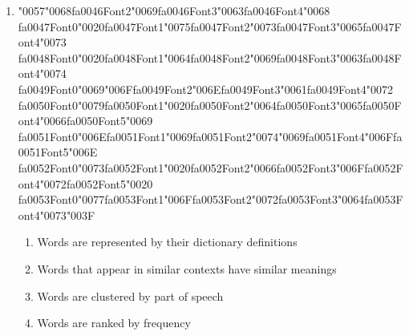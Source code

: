 \documentclass[12pt]{article}
\begin{document}
\begin{enumerate}[label=Q\arabic*.]
\item {\char"0057}{\char"0068}{\csname fa0046Font2\endcsname\char"0069}{\csname fa0046Font3\endcsname\char"0063}{\csname fa0046Font4\endcsname\char"0068} {\csname fa0047Font0\endcsname\char"0020}{\csname fa0047Font1\endcsname\char"0075}{\csname fa0047Font2\endcsname\char"0073}{\csname fa0047Font3\endcsname\char"0065}{\csname fa0047Font4\endcsname\char"0073} {\csname fa0048Font0\endcsname\char"0020}{\csname fa0048Font1\endcsname\char"0064}{\csname fa0048Font2\endcsname\char"0069}{\csname fa0048Font3\endcsname\char"0063}{\csname fa0048Font4\endcsname\char"0074} {\csname fa0049Font0\endcsname\char"0069}{\char"006F}{\csname fa0049Font2\endcsname\char"006E}{\csname fa0049Font3\endcsname\char"0061}{\csname fa0049Font4\endcsname\char"0072} {\csname fa0050Font0\endcsname\char"0079}{\csname fa0050Font1\endcsname\char"0020}{\csname fa0050Font2\endcsname\char"0064}{\csname fa0050Font3\endcsname\char"0065}{\csname fa0050Font4\endcsname\char"0066}{\csname fa0050Font5\endcsname\char"0069} {\csname fa0051Font0\endcsname\char"006E}{\csname fa0051Font1\endcsname\char"0069}{\csname fa0051Font2\endcsname\char"0074}{\char"0069}{\csname fa0051Font4\endcsname\char"006F}{\csname fa0051Font5\endcsname\char"006E} {\csname fa0052Font0\endcsname\char"0073}{\csname fa0052Font1\endcsname\char"0020}{\csname fa0052Font2\endcsname\char"0066}{\csname fa0052Font3\endcsname\char"006F}{\csname fa0052Font4\endcsname\char"0072}{\csname fa0052Font5\endcsname\char"0020} {\csname fa0053Font0\endcsname\char"0077}{\csname fa0053Font1\endcsname\char"006F}{\csname fa0053Font2\endcsname\char"0072}{\csname fa0053Font3\endcsname\char"0064}{\csname fa0053Font4\endcsname\char"0073}{\char"003F}
\begin{enumerate}[label=(\Alph*)]
    \item Words are represented by their dictionary definitions
    \item Words that appear in similar contexts have similar meanings
    \item Words are clustered by part of speech
    \item Words are ranked by frequency
\end{enumerate}

\end{enumerate}
\end{document}
